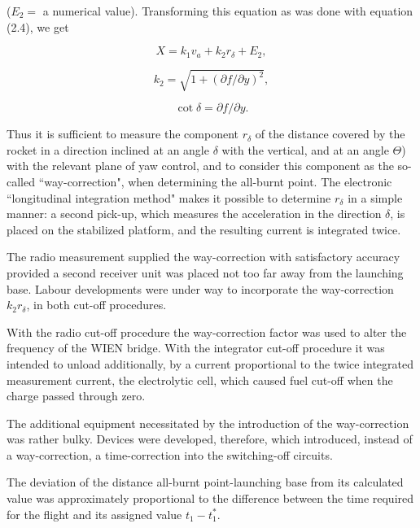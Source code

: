 \documentclass[12pt, a4paper]{article}
\begin{document}
($E_{2}=$ a numerical value). Transforming this equation as was done with equation (2.4), we get

\begin{equation}
  X=k_{1}v_{a}+k_{2}r_{\delta}+E_{2},
\end{equation}

\begin{equation}
  k_{2}=\sqrt{1+(\partial f/\partial y)^{2}},
\end{equation}

\begin{equation}
  \cot{\delta}=\partial  f/ \partial y.
\end{equation}

Thus it is sufficient to measure the component $r_{\delta}$ of the distance covered by the rocket in a direction inclined at an angle $\delta$ with the vertical, and at an angle $\Theta$) with the relevant plane of yaw control, and to consider this component as the so-called ``way-correction", when determining the all-burnt point. The electronic ``longitudinal integration method" makes it possible to determine $r_{\delta}$ in a simple manner: a second pick-up, which measures the acceleration in the direction $\delta$, is placed on the stabilized platform, and the resulting current is integrated twice.

The radio measurement supplied the way-correction with satisfactory accuracy provided a second receiver unit was placed not too far away from the launching base. Labour developments were under way to incorporate the way-correction $k_{2}r_{\delta}$, in both cut-off procedures.

With the radio cut-off procedure the way-correction factor was used to alter the frequency of the WIEN bridge. With the integrator cut-off procedure it was intended to unload additionally, by a current proportional to the twice integrated measurement current, the electrolytic cell, which caused fuel cut-off when the charge passed through zero.

The additional equipment necessitated by the introduction of the way-correction was rather bulky. Devices were developed, therefore, which introduced, instead of a way-correction, a time-correction into the switching-off circuits.

The deviation of the distance all-burnt point-launching base from its calculated value was approximately proportional to the difference between the time required for the flight and its assigned value $t_{1}-t_{1}^{*}$.
\end{document}
